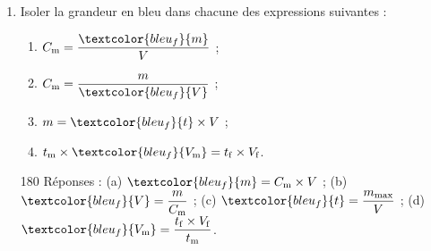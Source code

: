 \begin{enumerate}
\item Isoler la grandeur en bleu dans chacune des expressions suivantes :
\begin{multicols}{4}
\begin{enumerate}
\item $C_\mathrm{m} = \dfrac{\textcolor{bleu_f}{m}}{V}$ ;
\item $C_\mathrm{m} = \dfrac{m}{\textcolor{bleu_f}{V}}$ ;
\item $m = \textcolor{bleu_f}{t} \times V$ ;
\item $t_\mathrm{m}\times \textcolor{bleu_f}{V_\mathrm{m}} =  t_\mathrm{f}\times V_\mathrm{f}$.
\end{enumerate}
\end{multicols}


\flushright
\footnotesize
\begin{turn}{180}
Réponses :
(a) $\textcolor{bleu_f}{m} = C_\mathrm{m} \times V$ ; (b) $\textcolor{bleu_f}{V} = \dfrac{m}{C_\mathrm{m}} $ ; (c) $\textcolor{bleu_f}{t} = \dfrac{m_\mathrm{max}}{V}$ ; (d) $\textcolor{bleu_f}{V_\mathrm{m}} = \dfrac{t_\mathrm{f}\times V_\mathrm{f}}{t_\mathrm{m}}$.
\hfill
\end{turn}

\end{enumerate}

